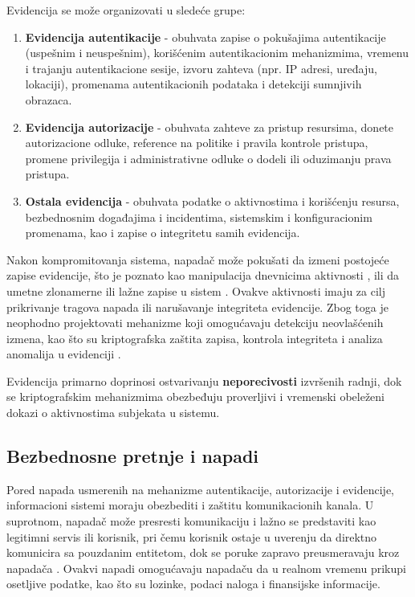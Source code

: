 Evidencija se može organizovati \cite{bishop2002art} u sledeće grupe:
\begin{enumerate}
\item \textbf{Evidencija autentikacije} - obuhvata zapise o pokušajima autentikacije (uspešnim i neuspešnim), korišćenim autentikacionim mehanizmima, vremenu i trajanju autentikacione sesije, izvoru zahteva (npr. IP adresi, uređaju, lokaciji), promenama autentikacionih podataka i detekciji sumnjivih obrazaca.
\item \textbf{Evidencija autorizacije} - obuhvata zahteve za pristup resursima, donete autorizacione odluke, reference na politike i pravila kontrole pristupa, promene privilegija i administrativne odluke o dodeli ili oduzimanju prava pristupa.
\item \textbf{Ostala evidencija} - obuhvata podatke o aktivnostima i korišćenju resursa, bezbednosnim događajima i incidentima, sistemskim i konfiguracionim promenama, kao i zapise o integritetu samih evidencija.
\end{enumerate}

Nakon kompromitovanja sistema, napadač može pokušati da izmeni postojeće zapise evidencije, što je poznato kao manipulacija dnevnicima aktivnosti , ili da umetne zlonamerne ili lažne zapise u sistem . Ovakve aktivnosti imaju za cilj prikrivanje tragova napada ili narušavanje integriteta evidencije. Zbog toga je neophodno projektovati mehanizme koji omogućavaju detekciju neovlašćenih izmena, kao što su kriptografska zaštita zapisa, kontrola integriteta i analiza anomalija u evidenciji \cite{schneier1999secure}.

Evidencija primarno doprinosi ostvarivanju \textbf{neporecivosti} izvršenih radnji, dok se kriptografskim mehanizmima obezbeđuju proverljivi i vremenski obeleženi dokazi o aktivnostima subjekata u sistemu.

\subsection{Bezbednosne pretnje i napadi}
Pored napada usmerenih na mehanizme autentikacije, autorizacije i evidencije, informacioni sistemi moraju obezbediti i zaštitu komunikacionih kanala. U suprotnom, napadač može presresti komunikaciju i lažno se predstaviti kao legitimni servis ili korisnik, pri čemu korisnik ostaje u uverenju da direktno komunicira sa pouzdanim entitetom, dok se poruke zapravo preusmeravaju kroz napadača \cite{mallik2019man, syverson1994taxonomy, baitha2018session}. Ovakvi napadi omogućavaju napadaču da u realnom vremenu prikupi osetljive podatke, kao što su lozinke, podaci naloga i finansijske informacije.

